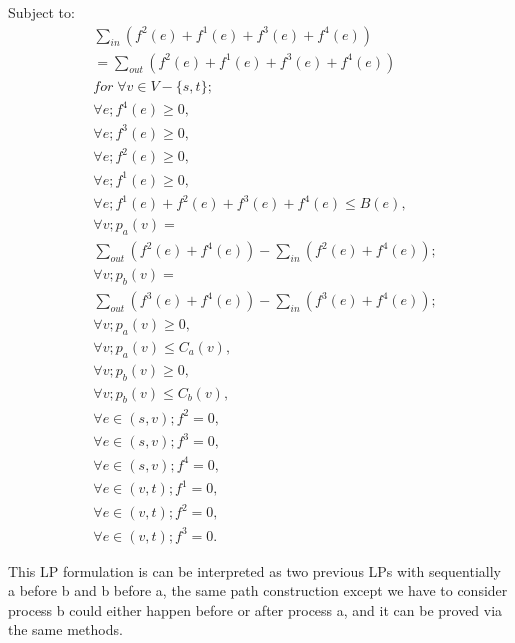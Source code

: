 \documentclass[twoside,leqno, 11pt]{article}
\begin{document}
Subject to:
\begin{subequations}
\begin{align*}
&\sum\limits_{in} ( f^2(e)+ f^1(e) +f^3(e)+f^4(e)) \nonumber\\
&= \sum\limits_{out } ( f^2(e)+ f^1(e)+f^3(e) + f^4(e))\\
&for\; \forall v \in V-\{s, t\}; \nonumber\\
&\forall e; f^4(e)\geq 0,\\
&\forall e; f^3(e)\geq 0,\\
&\forall e; f^2(e)\geq 0,\\
&\forall e; f^1(e)\geq 0,\\
&\forall e; f^1(e)+ f^2(e) + f^3(e) + f^4(e)\leq B(e),\\
&\forall v; p_a(v) =\nonumber\\
& \sum\limits_{out } (f^2(e)+f^4(e)) - \sum\limits_{in} (f^2(e)+f^4(e)); \\
&\forall v; p_b(v) = \nonumber\\
&\sum\limits_{out }( f^3(e) +f^4(e)) - \sum\limits_{in}( f^3(e) +f^4(e));\\
&\forall v;p_a(v)\geq 0, \\
&\forall v;p_a(v)\leq C_a(v),\\
&\forall v;p_b(v)\geq 0, \\
&\forall v;p_b(v)\leq C_b(v),\\
&\forall e\in (s,v); f^2=0, \\
&\forall e\in (s,v); f^3=0, \\
&\forall e\in (s,v); f^4=0, \\
&\forall e\in (v,t); f^1=0,\\
&\forall e\in (v,t); f^2=0,\\
&\forall e\in (v,t); f^3=0.
\end{align*}
\end{subequations}

This LP formulation is can be interpreted as two previous LPs with sequentially a before b and b before a, the same path construction except we have to consider process b could either happen before or after process a, and it can be proved via the same methods. 
\end{document}
